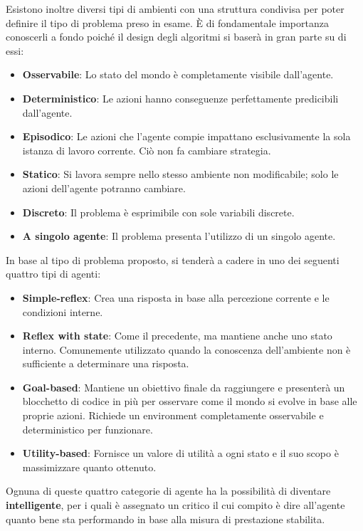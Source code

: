 \noindent Esistono inoltre diversi tipi di ambienti con una struttura condivisa per poter definire il tipo di problema preso in esame. È di fondamentale
importanza conoscerli a fondo poiché il design degli algoritmi si baserà in gran parte su di essi: \begin{itemize}
    \item \textbf{Osservabile}: Lo stato del mondo è completamente visibile dall'agente.
    \item \textbf{Deterministico}: Le azioni hanno conseguenze perfettamente predicibili dall'agente.
    \item \textbf{Episodico}: Le azioni che l'agente compie impattano esclusivamente la sola istanza di lavoro corrente. Ciò non fa cambiare strategia.
    \item \textbf{Statico}: Si lavora sempre nello stesso ambiente non modificabile; solo le azioni dell'agente potranno cambiare.
    \item \textbf{Discreto}: Il problema è esprimibile con sole variabili discrete.
    \item \textbf{A singolo agente}: Il problema presenta l'utilizzo di un singolo agente.
\end{itemize}

\noindent In base al tipo di problema proposto, si tenderà a cadere in uno dei seguenti quattro tipi di agenti: \begin{itemize}
    \item \textbf{Simple-reflex}: Crea una risposta in base alla percezione corrente e le condizioni interne.
    \item \textbf{Reflex with state}: Come il precedente, ma mantiene anche uno stato interno. Comunemente utilizzato quando la conoscenza dell'ambiente
        non è sufficiente a determinare una risposta.
    \item \textbf{Goal-based}: Mantiene un obiettivo finale da raggiungere e presenterà un blocchetto di codice in più per osservare come il mondo si
        evolve in base alle proprie azioni. Richiede un environment completamente osservabile e deterministico per funzionare.
    \item \textbf{Utility-based}: Fornisce un valore di utilità a ogni stato e il suo scopo è massimizzare quanto ottenuto.
\end{itemize}

\noindent Ognuna di queste quattro categorie di agente ha la possibilità di diventare \textbf{intelligente}, per i quali è assegnato un critico il cui
compito è dire all'agente quanto bene sta performando in base alla misura di prestazione stabilita.

